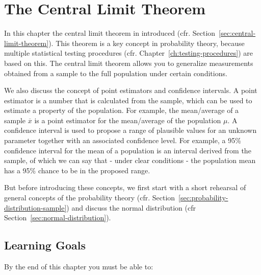 \chapter{The Central Limit Theorem}
\label{ch:central-limit-theorem}

In this chapter the central limit theorem in introduced (cfr. Section~\ref{sec:central-limit-theorem}). This theorem is a key concept in probability theory, because multiple statistical testing procedures (cfr. Chapter~\ref{ch:testing-procedures}) are based on this. The central limit theorem allows you to generalize measurements obtained from a sample to the full population under certain conditions.

We also discuss the concept of point estimators and confidence intervals. A point estimator is a number that is calculated from the sample, which can be used to estimate a property of the population. For example, the mean/average of a sample $\overline{x}$ is a point estimator for the mean/average of the population $\mu$. A confidence interval is used to propose a range of plausible values for an unknown parameter together with an associated confidence level. For example, a 95\% confidence interval for the mean of a population is an interval derived from the sample, of which we can say that - under clear conditions - the population mean has a 95\% chance to be in the proposed range.

But before introducing these concepts, we first start with a short rehearsal of general concepts of the probability theory (cfr. Section~\ref{sec:probability-distribution-sample}) and discuss the normal distribution (cfr Section~\ref{sec:normal-distribution}).

\section{Learning Goals}
\label{sec:central-limit-theorem-learning-goals}

By the end of this chapter you must be able to:


